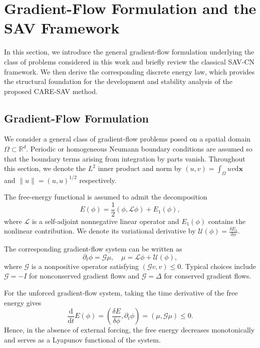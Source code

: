 \documentclass[10pt,reqno]{amsart}
\theoremstyle{remark}
\theoremstyle{definition}
\begin{document}

\section{Gradient-Flow Formulation and the SAV Framework}\label{sec:sav-framework}
In this section, we introduce the general gradient-flow formulation underlying the class of problems considered in this work and briefly review the classical SAV-CN framework. We then derive the corresponding discrete energy law, which provides the structural foundation for the development and stability analysis of the proposed CARE-SAV method.

\subsection{Gradient-Flow Formulation}
We consider a general class of gradient-flow problems posed on a spatial domain $\Omega\subset\mathbb{R}^d$. Periodic or homogeneous Neumann boundary conditions are assumed so that the boundary terms arising from integration by parts vanish. Throughout this section, we denote the $L^2$ inner product and norm by $(u,v) = \int_\Omega u v \mathrm{d} \boldsymbol{x} $ and $\|u\| = (u,u)^{1/2}$ respectively.

The free-energy functional is assumed to admit the decomposition
\begin{equation}
  E(\phi) = \frac{1}{2}(\phi,\mathcal{L}\phi) + E_1(\phi),
\end{equation}
where $\mathcal{L}$ is a self-adjoint nonnegative linear operator and $E_1(\phi)$ contains the nonlinear contribution. We denote its variational derivative by $\mathcal{U} (\phi) = \frac{\delta E_1}{\delta \phi}$.

The corresponding gradient-flow system can be written as
\begin{equation}
  \partial_t \phi = \mathcal{G} \mu, \quad \mu = \mathcal{L}\phi + \mathcal{U}(\phi),
\end{equation}
where $\mathcal{G}$ is a nonpositive operator satisfying $(\mathcal{G}v,v) \leq 0$. Typical choices include $\mathcal{G} = -I$ for nonconserved gradient flows and $\mathcal{G} = \Delta$ for conserved gradient flows.

For the unforced gradient-flow system, taking the time derivative of the free energy gives
\begin{equation}
  \frac{\mathrm{d}}{\mathrm{d}t} E(\phi) = \left(\frac{\delta E}{\delta \phi},  \partial_t \phi \right) = (\mu, \mathcal{G} \mu) \le 0.
\end{equation}
Hence, in the absence of external forcing, the free energy decreases monotonically and serves as a Lyapunov functional of the system.
\end{document}
